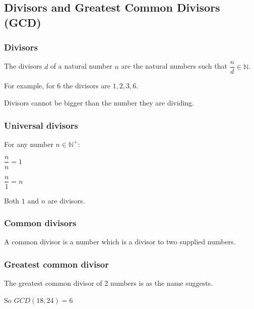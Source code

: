 
\subsection{Divisors and Greatest Common Divisors (GCD)}

\subsubsection{Divisors}

The divisors \(d\) of a natural number \(n\) are the natural numbers such that \(\dfrac{n}{d}\in \mathbb{N}\).

For example, for \(6\) the divisors are \(1, 2, 3, 6\).

Divisors cannot be bigger than the number they are dividing.

\subsubsection{Universal divisors}

For any number \(n \in \mathbb{N}^+\):

\(\dfrac{n}{n}=1\)

\(\dfrac{n}{1}=n\)

Both \(1\) and \(n\) are divisors.

\subsubsection{Common divisors}

A common divisor is a number which is a divisor to two supplied numbers.

\subsubsection{Greatest common divisor}

The greatest common divisor of \(2\) numbers is as the name suggests.

So \(GCD(18,24)=6\)

